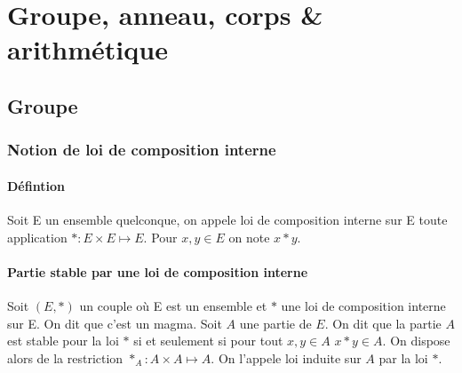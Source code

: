 \chapter{Groupe, anneau, corps \& arithmétique}
\label{chap:groupes}
\minitoc
\minilof
\minilot
\section{Groupe}
\subsection{Notion de loi de composition interne}
\subsubsection{Défintion}
\begin{defdef}
  Soit E un ensemble quelconque, on appele loi de composition interne sur E toute application $*:E\times E \longmapsto E$. Pour $x,y \in E$ on note $x*y$.
\end{defdef}
\subsubsection{Partie stable par une loi de composition interne}
\begin{defdef}
  Soit $(E,*)$ un couple où E est un ensemble et $*$ une loi de composition interne sur E. On dit que c'est un magma. Soit $A$ une partie de $E$. On dit que la partie $A$ est stable pour la loi $*$ si et seulement si pour tout $x,y \in A$ $x*y \in A$. On dispose alors de la restriction $*_{A} : A\times A \longmapsto A$. On l'appele loi induite sur $A$ par la loi $*$.
\end{defdef}
